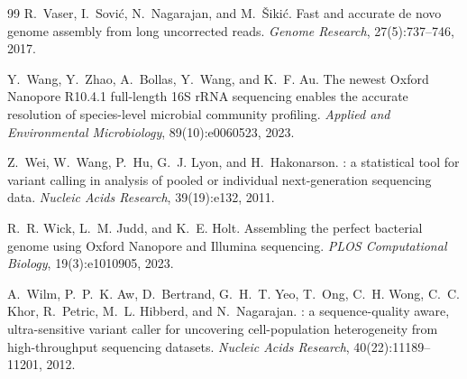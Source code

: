 \documentclass[11pt]{article}
\begin{document}
\begin{thebibliography}{99}
R.~Vaser, I.~Sovi\'{c}, N.~Nagarajan, and M.~\v{S}iki\'{c}.
\newblock Fast and accurate de novo genome assembly from long uncorrected reads.
\newblock \emph{Genome Research}, 27(5):737--746, 2017.

Y.~Wang, Y.~Zhao, A.~Bollas, Y.~Wang, and K.~F. Au.
\newblock The newest {Oxford Nanopore} {R10.4.1} full-length {16S} {rRNA}
sequencing enables the accurate resolution of species-level microbial community
profiling.
\newblock \emph{Applied and Environmental Microbiology}, 89(10):e0060523, 2023.

Z.~Wei, W.~Wang, P.~Hu, G.~J. Lyon, and H.~Hakonarson.
: a statistical tool for variant calling in analysis of pooled
or individual next-generation sequencing data.
\newblock \emph{Nucleic Acids Research}, 39(19):e132, 2011.

R.~R. Wick, L.~M. Judd, and K.~E. Holt.
\newblock Assembling the perfect bacterial genome using {Oxford Nanopore} and
{Illumina} sequencing.
\newblock \emph{PLOS Computational Biology}, 19(3):e1010905, 2023.

A.~Wilm, P.~P.~K. Aw, D.~Bertrand, G.~H.~T. Yeo, T.~Ong, C.~H. Wong,
C.~C. Khor, R.~Petric, M.~L. Hibberd, and N.~Nagarajan.
: a sequence-quality aware, ultra-sensitive variant caller for
uncovering cell-population heterogeneity from high-throughput sequencing
datasets.
\newblock \emph{Nucleic Acids Research}, 40(22):11189--11201, 2012.

\end{thebibliography}
\end{document}
